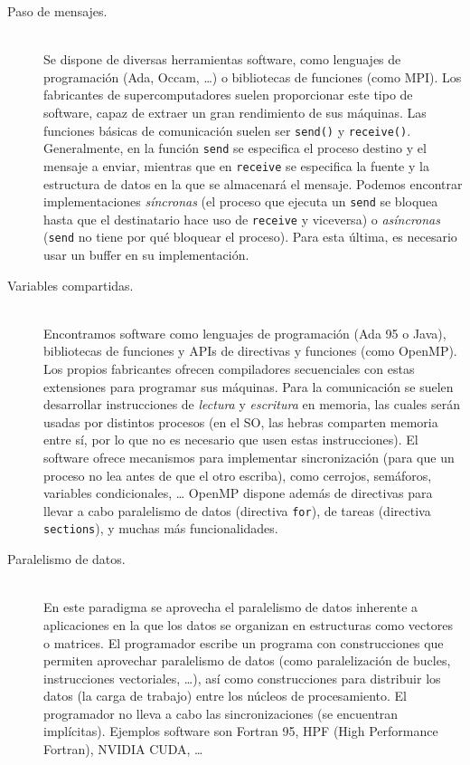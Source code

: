 \begin{description}
    \item [Paso de mensajes.]~\\
        Se dispone de diversas herramientas software, como lenguajes de programación (Ada, Occam, \ldots) o bibliotecas de funciones (como MPI). Los fabricantes de supercomputadores suelen proporcionar este tipo de software, capaz de extraer un gran rendimiento de sus máquinas. Las funciones básicas de comunicación suelen ser \verb|send()| y \verb|receive()|. Generalmente, en la función \verb|send| se especifica el proceso destino y el mensaje a enviar, mientras que en \verb|receive| se especifica la fuente y la estructura de datos en la que se almacenará el mensaje. Podemos encontrar implementaciones \emph{síncronas} (el proceso que ejecuta un \verb|send| se bloquea hasta que el destinatario hace uso de \verb|receive| y viceversa) o \emph{asíncronas} (\verb|send| no tiene por qué bloquear el proceso). Para esta última, es necesario usar un buffer en su implementación. 
    \item [Variables compartidas.]~\\
        Encontramos software como lenguajes de programación (Ada 95 o Java), bibliotecas de funciones y APIs de directivas y funciones (como OpenMP). Los propios fabricantes ofrecen compiladores secuenciales con estas extensiones para programar sus máquinas. Para la comunicación se suelen desarrollar instrucciones de \emph{lectura} y \emph{escritura} en memoria, las cuales serán usadas por distintos procesos (en el SO, las hebras comparten memoria entre sí, por lo que no es necesario que usen estas instrucciones). El software ofrece mecanismos para implementar sincronización (para que un proceso no lea antes de que el otro escriba), como cerrojos, semáforos, variables condicionales, \ldots 
        OpenMP dispone además de directivas para llevar a cabo paralelismo de datos (directiva \verb|for|), de tareas (directiva \verb|sections|), y muchas más funcionalidades. 
    \item [Paralelismo de datos.]~\\
        En este paradigma se aprovecha el paralelismo de datos inherente a aplicaciones en la que los datos se organizan en estructuras como vectores o matrices. El programador escribe un programa con construcciones que permiten aprovechar paralelismo de datos (como paralelización de bucles, instrucciones vectoriales, \ldots), así como construcciones para distribuir los datos (la carga de trabajo) entre los núcleos de procesamiento. El programador no lleva a cabo las sincronizaciones (se encuentran implícitas). Ejemplos software son Fortran 95, HPF (High Performance Fortran), NVIDIA CUDA, \ldots
\end{description}

